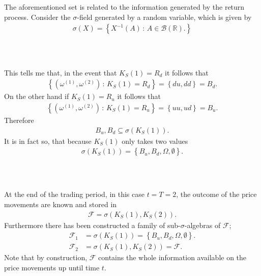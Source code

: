 \documentclass{beamer}
\numberwithin{equation}{section}
\begin{document}
\begin{frame}\frametitle{{\normalsize \secname} \\ {\large \subsecname}}
    The aforementioned set is related to the information generated by the return process.
    Consider the $\sigma$-field generated by a random variable, which is given by
    \begin{align}
        \sigma(X) = \left\{
            X^{-1}(A) \, : \, A \in \mathscr{B}(\mathbb{R}).
        \right\}
    \end{align}
\end{frame}

\begin{frame}\frametitle{{\normalsize \secname} \\ {\large \subsecname}}
    This tells me that, in the event that $K_S(1) = R_d$ it follows that
    \begin{align}
        \left\{
            \left(
                \omega^{(1)}, \omega^{(2)}
            \right)
            \, : \,
            K_S(1) = R_d
        \right\} =
        \left\{
            du, dd
        \right\} = B_d.
    \end{align}
    On the other hand if $K_S(1) = R_u$ it follows that
    \begin{align}
        \left\{
            \left(
                \omega^{(1)}, \omega^{(2)}
            \right)
            \, : \,
            K_S(1) = R_u
        \right\} =
        \left\{
            uu, ud
        \right\} = B_u.
    \end{align}
    Therefore
    \begin{align}
        B_u, B_d \subseteq \sigma\left(K_S(1)\right).
    \end{align}
    It is in fact so, that because $K_S(1)$ only takes two values
    \begin{align}
        \sigma(K_S(1)) = \left\{B_u, B_d, \Omega, \emptyset\right\}.
    \end{align}
\end{frame}

\begin{frame}\frametitle{{\normalsize \secname} \\ {\large \subsecname}}
    At the end of the trading period, in this case $t = T = 2$, the outcome of the price movements are known and stored in
    \begin{align}
        \mathscr{F} = \sigma\left(K_S(1), K_S(2)\right).
    \end{align}
    Furthermore there has been constructed a family of sub-$\sigma$-algebras of $\mathscr{F}$;
    \begin{align}
        \mathscr{F}_1 &= \sigma(K_S(1)) = \left\{B_u, B_d, \Omega, \emptyset\right\}. \\
        \mathscr{F}_2 &= \sigma(K_S(1), K_S(2)) = \mathscr{F}.
    \end{align}
    Note that by construction, $\mathscr{F}$ contains the whole information available on the price movements up until time $t$.
\end{frame}
\end{document}
